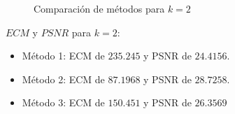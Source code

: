 \begin{figure}[H]
    \centering
    \qquad
    \qquad
    \caption{Comparación de métodos para $k = 2$}%
    \label{fig:example}%
\end{figure}

$ECM$ y $PSNR$ para $k = 2$:

\begin{itemize}
 \item Método 1: ECM de $235.245$ y PSNR de $24.4156$.
 \item Método 2: ECM de $87.1968$ y PSNR de $28.7258$.
 \item Método 3: ECM de $150.451$ y PSNR de $26.3569$
\end{itemize}

